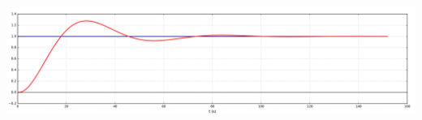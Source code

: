 \documentclass[10pt,fleqn]{article} %
\begin{document}
\ifprof
\else

\fi


\ifprof
\begin{center}
\includegraphics[width=\linewidth]{images/cor_02}
\end{center}

\else
\fi



\ifprof
\else
\fi

%
%
%
\end{document}
